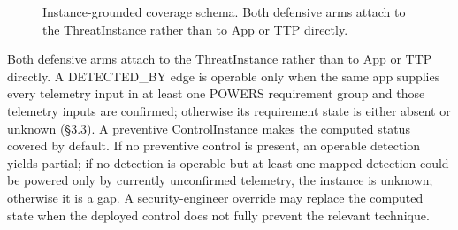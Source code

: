 \documentclass[10pt]{article}
\begin{document}
\begin{figure}[t]
\centering
{}
\caption{Instance-grounded coverage schema. Both defensive arms attach to the ThreatInstance rather than to App or TTP directly.}
\label{fig:schema}
\end{figure}

Both defensive arms attach to the ThreatInstance rather than to App or TTP directly. A DETECTED\_BY edge is operable only when the same app supplies every telemetry input in at least one POWERS requirement group and those telemetry inputs are confirmed; otherwise its requirement state is either absent or unknown (\S3.3). A preventive ControlInstance makes the computed status covered by default. If no preventive control is present, an operable detection yields partial; if no detection is operable but at least one mapped detection could be powered only by currently unconfirmed telemetry, the instance is unknown; otherwise it is a gap. A security-engineer override may replace the computed state when the deployed control does not fully prevent the relevant technique.
\end{document}
